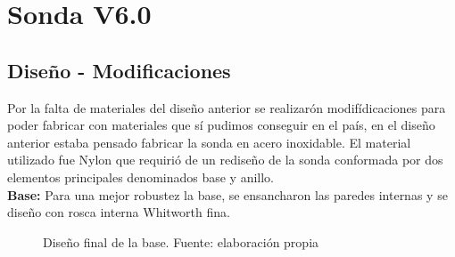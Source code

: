 \section{Sonda V6.0}
\subsection{Diseño - Modificaciones}
Por la falta de materiales del diseño anterior se realizar\'on modif\'idicaciones para poder fabricar con materiales que s\'i pudimos conseguir en el pa\'is, en el diseño anterior estaba pensado fabricar la sonda en acero inoxidable.
El material utilizado fue Nylon que requiri\'o de un rediseño de la sonda conformada por dos elementos principales denominados base y anillo. \\ 

\textbf{Base: }
Para una mejor robustez la base, se ensancharon las paredes internas y se diseño  con  rosca interna Whitworth fina.\\ 
\begin{figure}[h]
\centering
{}
\caption{Dise\~no final de la base. Fuente: elaboración propia}
\label{fig:Base2019}
\end{figure}


